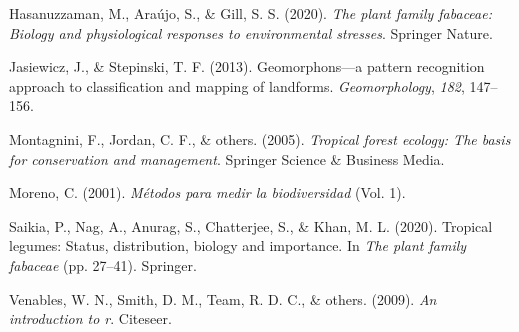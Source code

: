 \documentclass[11pt,]{article}
\begin{document}
\hypertarget{ref-hasanuzzaman2020plant}{}
Hasanuzzaman, M., Araújo, S., \& Gill, S. S. (2020). \emph{The plant
family fabaceae: Biology and physiological responses to environmental
stresses}. Springer Nature.

\hypertarget{ref-jasiewicz2013geomorphons}{}
Jasiewicz, J., \& Stepinski, T. F. (2013). Geomorphons---a pattern
recognition approach to classification and mapping of landforms.
\emph{Geomorphology}, \emph{182}, 147--156.

\hypertarget{ref-montagnini2005tropical}{}
Montagnini, F., Jordan, C. F., \& others. (2005). \emph{Tropical forest
ecology: The basis for conservation and management}. Springer Science \&
Business Media.

\hypertarget{ref-book}{}
Moreno, C. (2001). \emph{Métodos para medir la biodiversidad} (Vol. 1).

\hypertarget{ref-saikia2020tropical}{}
Saikia, P., Nag, A., Anurag, S., Chatterjee, S., \& Khan, M. L. (2020).
Tropical legumes: Status, distribution, biology and importance. In
\emph{The plant family fabaceae} (pp. 27--41). Springer.

\hypertarget{ref-venables2009introduction}{}
Venables, W. N., Smith, D. M., Team, R. D. C., \& others. (2009).
\emph{An introduction to r}. Citeseer.




\newpage
\singlespacing 
\end{document}
